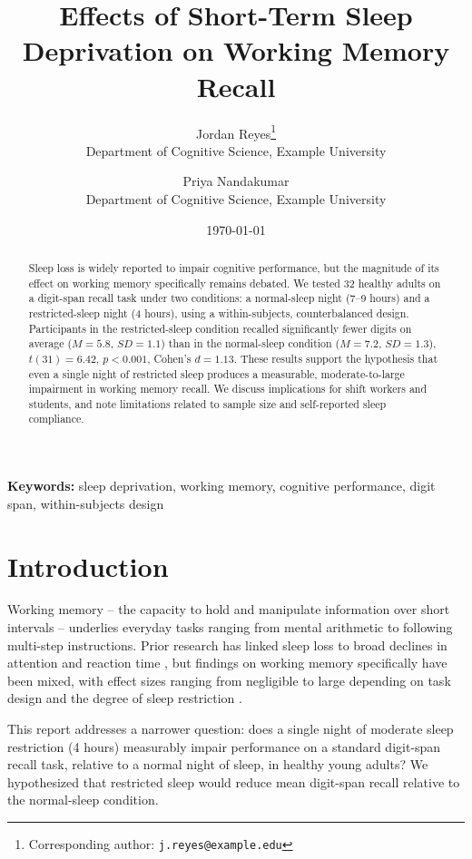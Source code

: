 \documentclass[11pt, a4paper]{article}
\title{Effects of Short-Term Sleep Deprivation on Working Memory Recall}
\author{
    Jordan Reyes\thanks{Corresponding author: \texttt{j.reyes@example.edu}} \\
    Department of Cognitive Science, Example University
    \and
    Priya Nandakumar \\
    Department of Cognitive Science, Example University
}
\date{\today}
\begin{document}
\maketitle

\begin{abstract}
Sleep loss is widely reported to impair cognitive performance, but the
magnitude of its effect on working memory specifically remains debated. We
tested 32 healthy adults on a digit-span recall task under two conditions:
a normal-sleep night (\qty{7}{}--\qty{9}{} hours) and a restricted-sleep
night (\qty{4}{} hours), using a within-subjects, counterbalanced design.
Participants in the restricted-sleep condition recalled significantly
fewer digits on average ($M = 5.8$, $SD = 1.1$) than in the normal-sleep
condition ($M = 7.2$, $SD = 1.3$), $t(31) = 6.42$, $p < 0.001$, Cohen's
$d = 1.13$. These results support the hypothesis that even a single night
of restricted sleep produces a measurable, moderate-to-large impairment in
working memory recall. We discuss implications for shift workers and
students, and note limitations related to sample size and self-reported
sleep compliance.
\end{abstract}

\noindent\textbf{Keywords:} sleep deprivation, working memory, cognitive
performance, digit span, within-subjects design

\tableofcontents
\newpage

\section{Introduction}
\label{sec:introduction}

Working memory -- the capacity to hold and manipulate information over
short intervals -- underlies everyday tasks ranging from mental arithmetic
to following multi-step instructions. Prior research has linked sleep loss
to broad declines in attention and reaction time \citep{killgore2010}, but
findings on working memory specifically have been mixed, with effect sizes
ranging from negligible to large depending on task design and the degree
of sleep restriction \citep{lowe2017}.

This report addresses a narrower question: does a single night of
moderate sleep restriction (4 hours) measurably impair performance on a
standard digit-span recall task, relative to a normal night of sleep, in
healthy young adults? We hypothesized that restricted sleep would reduce
mean digit-span recall relative to the normal-sleep condition.
\end{document}
